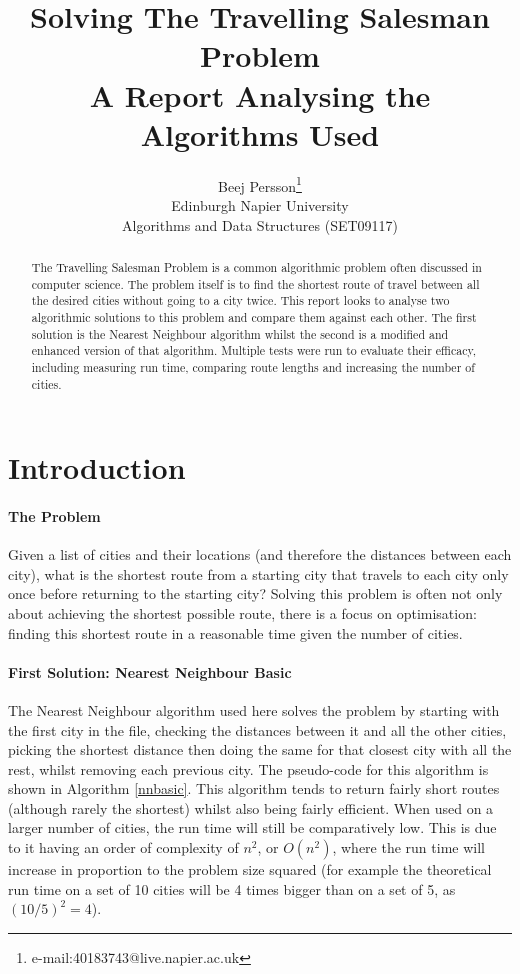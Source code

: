 \documentclass[conference,backref=page]{acmsiggraph}
\title{Solving The Travelling Salesman Problem\\
	   A Report Analysing the Algorithms Used}
\author{Beej Persson\thanks{e-mail:40183743@live.napier.ac.uk} \\
Edinburgh Napier University\\
Algorithms and Data Structures (SET09117)}
\begin{document}
\maketitle

\raggedbottom

\begin{abstract}

The Travelling Salesman Problem is a common algorithmic problem often discussed in computer science. The problem itself is to find the shortest route of travel between all the desired cities without going to a city twice. This report looks to analyse two algorithmic solutions to this problem and compare them against each other. The first solution is the Nearest Neighbour algorithm whilst the second is a modified and enhanced version of that algorithm. Multiple tests were run to evaluate their efficacy, including measuring run time, comparing route lengths and increasing the number of cities.

\end{abstract}

\keywordlist

\section{Introduction}

\paragraph{The Problem}
Given a list of cities and their locations (and therefore the distances between each city), what is the shortest route from a starting city that travels to each city only once before returning to the starting city? Solving this problem is often not only about achieving the shortest possible route, there is a focus on optimisation: finding this shortest route in a reasonable time given the number of cities.

\paragraph{First Solution: Nearest Neighbour Basic}
The Nearest Neighbour algorithm used here solves the problem by starting with the first city in the file, checking the distances between it and all the other cities, picking the shortest distance then doing the same for that closest city with all the rest, whilst removing each previous city. The pseudo-code for this algorithm is shown in Algorithm \ref{nnbasic}. This algorithm tends to return fairly short routes (although rarely the shortest) whilst also being fairly efficient. When used on a larger number of cities, the run time will still be comparatively low. This is due to it having an order of complexity of $n^2$, or $O(n^2)$, where the run time will increase in proportion to the problem size squared (for example the theoretical run time on a set of 10 cities will be 4 times bigger than on a set of 5, as $(10/5)^2 = 4$).
\end{document}
